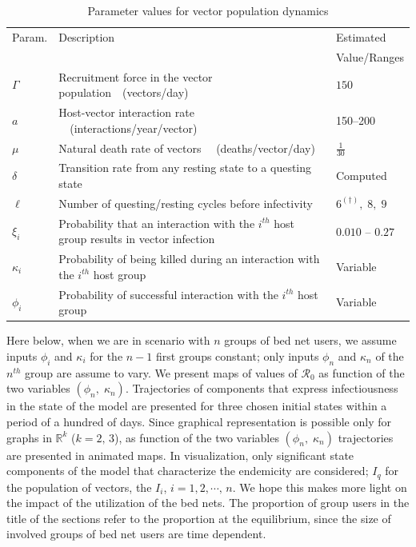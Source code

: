 \documentclass[a4paper]{article}
\begin{document}
\begin{table}[phtb]
	\captionsetup{skip=0pt}\caption{Parameter values for vector population dynamics}\label{tab.tab1}
	\begin{tabular}{p{1.38cm}p{12cm}p{2.5cm}}
		\hline
		Param. & Description & Estimated \\ && Value/Ranges \\
		\hline
		$\Gamma$ & Recruitment force in the vector population~~(vectors/day) & $150$ \\
		$a$ & Host-vector interaction rate ~~(interactions/year/vector) & 150--200  \\
		$\mu$ & Natural death rate of vectors ~~(deaths/vector/day) & ${\frac{1}{30}}$ \\
		$\delta$ & Transition rate from any resting state to a questing state & Computed \\
		$\ell$ & Number of questing/resting cycles before infectivity & $6^{(\dag)},\;8,\;9$ \\
		$\xi_i$ & Probability that an interaction with the $i^{th}$ host group results in vector infection & $0.010$ -- $0.27$\\ 
		
		$\kappa_i$ & Probability of being killed during an interaction with the $i^{th}$ host group &Variable\\
		$\phi_i$ & Probability of  successful interaction with the $i^{th}$ host group & Variable\\
		\hline
	\end{tabular}
\vspace{-16pt}\end{table}


\noindent Here below, when we are in scenario with $n$ groups of bed net users, we assume inputs $\phi_i$ and $\kappa_i$ for the $n-1$ first groups constant; only inputs $\phi_n$ and $\kappa_n$ of the $n^{th}$ group are assume to vary. We present maps of values of $\mathcal R_0$ as function of  the two variables $(\phi_n,\;\kappa_n)$. Trajectories of components that express infectiousness in the state of the model are presented for three chosen initial states within a period of a hundred of days. Since graphical representation is possible only for graphs in $\mathbb R^k$ ($k=2,\,3$), as function of the two variables $(\phi_n,\;\kappa_n)$ trajectories are presented in animated maps. In visualization, only significant state components of the model that characterize the endemicity are considered; $I_q$ for the population of vectors, the $I_i$, $i = 1,2,\cdots,\,n$. We hope this makes more light on the impact of the utilization of the bed nets. The proportion of group users in the title of the sections refer to the proportion at the equilibrium, since the size of involved groups of bed net users are time dependent. 
\end{document}
